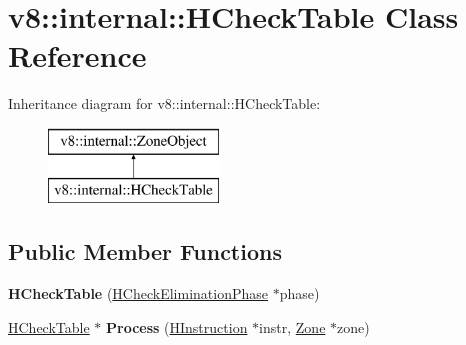 \hypertarget{classv8_1_1internal_1_1_h_check_table}{}\section{v8\+:\+:internal\+:\+:H\+Check\+Table Class Reference}
\label{classv8_1_1internal_1_1_h_check_table}
Inheritance diagram for v8\+:\+:internal\+:\+:H\+Check\+Table\+:\begin{figure}[H]
\begin{center}
\leavevmode
\includegraphics[height=2.000000cm]{classv8_1_1internal_1_1_h_check_table}
\end{center}
\end{figure}
\subsection*{Public Member Functions}
\begin{DoxyCompactItemize}
\item 
{\bfseries H\+Check\+Table} (\hyperlink{classv8_1_1internal_1_1_h_check_elimination_phase}{H\+Check\+Elimination\+Phase} $\ast$phase)\hypertarget{classv8_1_1internal_1_1_h_check_table_af9ddda8eac24c84d8b5cb41241868469}{}\label{classv8_1_1internal_1_1_h_check_table_af9ddda8eac24c84d8b5cb41241868469}

\item 
\hyperlink{classv8_1_1internal_1_1_h_check_table}{H\+Check\+Table} $\ast$ {\bfseries Process} (\hyperlink{classv8_1_1internal_1_1_h_instruction}{H\+Instruction} $\ast$instr, \hyperlink{classv8_1_1internal_1_1_zone}{Zone} $\ast$zone)\hypertarget{classv8_1_1internal_1_1_h_check_table_a3947bbc03f0e5b37b2dd54fc1064d95a}{}\label{classv8_1_1internal_1_1_h_check_table_a3947bbc03f0e5b37b2dd54fc1064d95a}

\end{DoxyCompactItemize}
